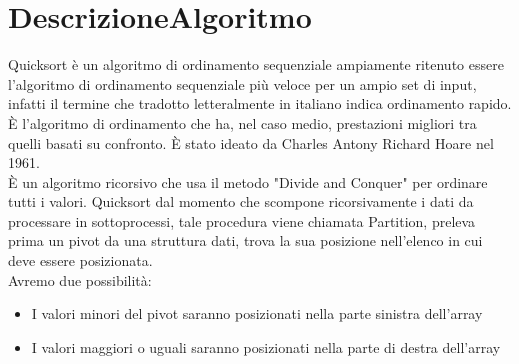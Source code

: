 \chapter{DescrizioneAlgoritmo}



Quicksort è un algoritmo di ordinamento sequenziale ampiamente ritenuto essere l'algoritmo di ordinamento sequenziale più veloce per un ampio set di input, infatti il termine che tradotto letteralmente in italiano indica ordinamento rapido. È l'algoritmo di ordinamento che ha, nel caso medio, prestazioni migliori tra quelli basati su confronto. È stato ideato da Charles Antony Richard Hoare nel 1961.\\ 
È un algoritmo ricorsivo che usa il metodo "Divide and Conquer" per ordinare tutti i valori. Quicksort dal momento che scompone ricorsivamente i dati da processare in sottoprocessi, tale procedura viene chiamata Partition, preleva prima un pivot da una struttura dati, trova la sua posizione nell'elenco in cui deve essere posizionata. \\
Avremo due possibilità:
\begin{itemize}
\item I valori minori del pivot saranno posizionati nella parte sinistra dell'array
\item I valori maggiori o uguali saranno posizionati nella parte di destra dell'array
\end{itemize}